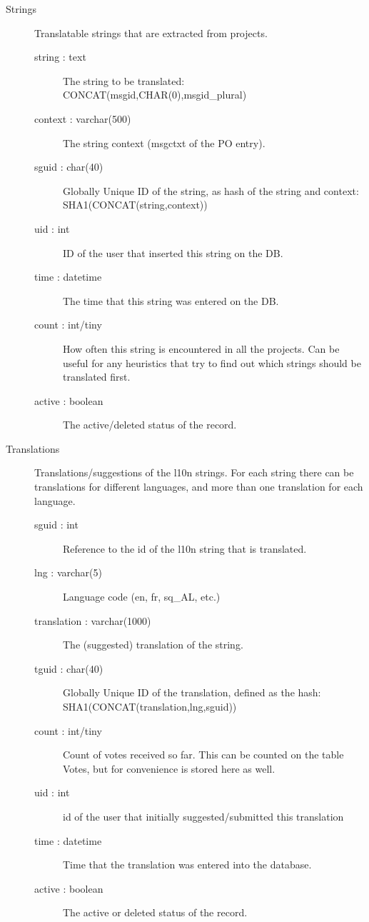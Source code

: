 \documentclass[11pt]{article}
\begin{document}
\begin{description}
\item [Strings] Translatable strings that are extracted from projects.

\begin{description}
\item [string : text] The string to be translated:
          CONCAT(msgid,CHAR(0),msgid\_{}plural)
\item [context : varchar(500)] The string context (msgctxt of the PO
          entry).
\item [sguid : char(40)] Globally Unique ID of the string, as hash
          of the string and context: SHA1(CONCAT(string,context))
\item [uid : int] ID of the user that inserted this string
          on the DB.
\item [time : datetime] The time that this string was
          entered on the DB.
\item [count : int/tiny] How often this string is encountered in
          all the projects. Can be useful for any heuristics that try
          to find out which strings should be translated first.
\item [active : boolean] The active/deleted status of the record.
\end{description}

\item [Translations] Translations/suggestions of the l10n strings.
          For each string there can be translations for different
          languages, and more than one translation for each language.

\begin{description}
\item [sguid : int] Reference to the id of the l10n string that is
          translated.
\item [lng : varchar(5)] Language code (en, fr, sq\_{}AL, etc.)
\item [translation : varchar(1000)] The (suggested) translation of
          the string.
\item [tguid : char(40)] Globally Unique ID of the translation,
          defined as the hash: SHA1(CONCAT(translation,lng,sguid))
\item [count : int/tiny] Count of votes received so far. This can be
          counted on the table Votes, but for convenience is stored
          here as well.
\item [uid : int] id of the user that initially suggested/submitted
          this translation
\item [time : datetime] Time that the translation was
          entered into the database.
\item [active : boolean] The active or deleted status of the record.
\end{description}


\end{description}
\end{document}
